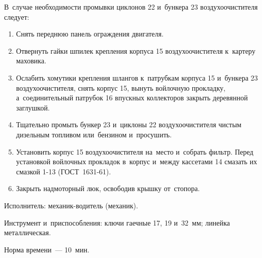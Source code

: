 В~случае необходимости промывки циклонов 22 и~бункера 23 воздухоочистителя следует: 
\begin{enumerate}
    \item Снять переднюю панель ограждения двигателя. 
    \item Отвернуть гайки шпилек крепления корпуса 15 воздухоочистителя к~картеру маховика. 
    \item Ослабить хомутики крепления шлангов к~патрубкам корпуса 15 и~бункера 23 воздухоочистителя, снять корпус 15, вынуть войлочную прокладку, а~соединительный патрубок 16 впускных коллекторов закрыть деревянной заглушкой. 
    \item Тщательно промыть бункер 23 и~циклоны 22 воздухоочистителя чистым дизельным топливом или~бензином и~просушить. 
    \item Установить корпус 15 воздухоочистителя на~место и~собрать фильтр. Перед установкой войлочных прокладок в~корпус и~между кассетами 14 смазать их смазкой 1-13 (ГОСТ~1631-61). 
    \item Закрыть надмоторный люк, освободив крышку от~стопора. 
\end{enumerate}


\noindent
Исполнитель: механик-водитель (механик). 

\noindent
Инструмент и~приспособления: ключи гаечные 17, 19 и~32~мм; линейка металлическая. 

\noindent
Норма времени~--- 10~мин. 

